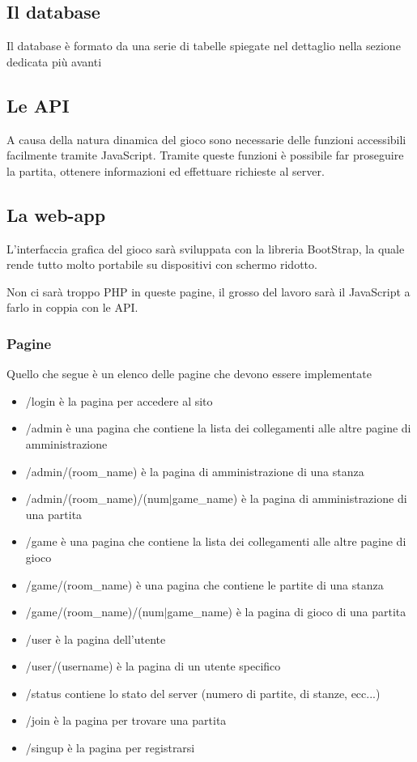 \documentclass[10pt,a4paper]{article}
\begin{document}
\subsection{Il database}
Il database è formato da una serie di tabelle spiegate nel dettaglio nella sezione dedicata più avanti

\subsection{Le API}
A causa della natura dinamica del gioco sono necessarie delle funzioni accessibili facilmente tramite JavaScript. Tramite queste funzioni è possibile far proseguire la partita, ottenere informazioni ed effettuare richieste al server.

\subsection{La web-app}
L'interfaccia grafica del gioco sarà sviluppata con la libreria BootStrap, la quale rende tutto molto portabile su dispositivi con schermo ridotto. 

Non ci sarà troppo PHP in queste pagine, il grosso del lavoro sarà il JavaScript a farlo in coppia con le API.

\subsubsection*{Pagine}
Quello che segue è un elenco delle pagine che devono essere implementate
\begin{itemize}
\item \textsf{/login} è la pagina per accedere al sito
\item \textsf{/admin} è una pagina che contiene la lista dei collegamenti alle altre pagine di amministrazione 
\item \textsf{/admin/(room\_name)} è la pagina di amministrazione di una stanza
\item \textsf{/admin/(room\_name)/(num$|$game\_name)} è la pagina di amministrazione di una partita
\item \textsf{/game} è una pagina che contiene la lista dei collegamenti alle altre pagine di gioco
\item \textsf{/game/(room\_name)} è una pagina che contiene le partite di una stanza
\item \textsf{/game/(room\_name)/(num$|$game\_name)} è la pagina di gioco di una partita
\item \textsf{/user} è la pagina dell'utente
\item \textsf{/user/(username)} è la pagina di un utente specifico
\item \textsf{/status} contiene lo stato del server (numero di partite, di stanze, ecc...)
\item \textsf{/join} è la pagina per trovare una partita
\item \textsf{/singup} è la pagina per registrarsi
\end{itemize}
\end{document}
